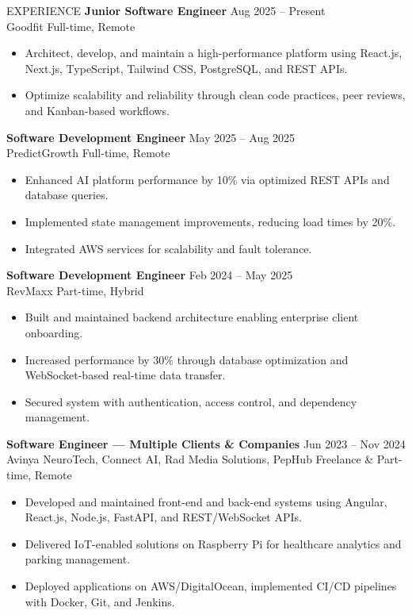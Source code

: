 \documentclass{resume}
\begin{document}
\begin{rSection}{EXPERIENCE}
	{\bf Junior Software Engineer} \hfill {Aug 2025 -- Present}\\
	Goodfit \hfill {Full-time, Remote}
	\begin{itemize}
		\item Architect, develop, and maintain a high-performance platform using React.js, Next.js, TypeScript, Tailwind CSS, PostgreSQL, and REST APIs.
		\item Optimize scalability and reliability through clean code practices, peer reviews, and Kanban-based workflows.
	\end{itemize}
	{\bf Software Development Engineer} \hfill {May 2025 -- Aug 2025}\\
	PredictGrowth \hfill {Full-time, Remote}
	\begin{itemize}
		\item Enhanced AI platform performance by 10\% via optimized REST APIs and database queries.
		\item Implemented state management improvements, reducing load times by 20\%.
		\item Integrated AWS services for scalability and fault tolerance.
	\end{itemize}
	{\bf Software Development Engineer} \hfill {Feb 2024 -- May 2025}\\
	RevMaxx \hfill {Part-time, Hybrid}
	\begin{itemize}
		\item Built and maintained backend architecture enabling enterprise client onboarding.
		\item Increased performance by 30\% through database optimization and WebSocket-based real-time data transfer.
		\item Secured system with authentication, access control, and dependency management.
	\end{itemize}
	{\bf Software Engineer — Multiple Clients \& Companies} \hfill {Jun 2023 -- Nov 2024}\\
	Avinya NeuroTech, Connect AI, Rad Media Solutions, PepHub \hfill {Freelance \& Part-time, Remote}
	\begin{itemize}
		\item Developed and maintained front-end and back-end systems using Angular, React.js, Node.js, FastAPI, and REST/WebSocket APIs.
		\item Delivered IoT-enabled solutions on Raspberry Pi for healthcare analytics and parking management.
		\item Deployed applications on AWS/DigitalOcean, implemented CI/CD pipelines with Docker, Git, and Jenkins.
	\end{itemize}
\end{rSection}
\end{document}
